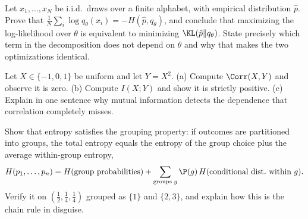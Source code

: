 \begin{exercise}
\label{ch33:ex-mle-proof}
Let $x_1,\dots,x_N$ be i.i.d.\ draws over a finite alphabet, with empirical distribution $\hat p$. Prove
that $\frac1N\sum_i \log q_\theta(x_i) = -H(\hat p, q_\theta)$, and conclude that maximizing the
log-likelihood over $\theta$ is equivalent to minimizing $\KL(\hat p\|q_\theta)$. State precisely which
term in the decomposition does not depend on $\theta$ and why that makes the two optimizations identical.
\end{exercise}

\begin{exercise}
\label{ch33:ex-mi-indep}
Let $X \in \{-1,0,1\}$ be uniform and let $Y = X^2$. (a) Compute $\Corr(X,Y)$ and observe it is zero.
(b) Compute $I(X;Y)$ and show it is strictly positive. (c) Explain in one sentence why mutual information
detects the dependence that correlation completely misses.
\end{exercise}

\begin{exercise}
\label{ch33:ex-grouping}
Show that entropy satisfies the grouping property: if outcomes are partitioned into groups, the total
entropy equals the entropy of the group choice plus the average within-group entropy,
\[
  H(p_1,\dots,p_n) = H(\text{group probabilities}) + \sum_{\text{groups } g} \P(g)\,H(\text{conditional dist.\ within } g).
\]
Verify it on $(\tfrac12,\tfrac14,\tfrac14)$ grouped as $\{1\}$ and $\{2,3\}$, and explain how this is the
chain rule in disguise.
\end{exercise}
